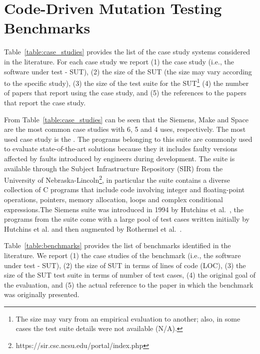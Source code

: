 

\section{Code-Driven Mutation Testing Benchmarks}
\label{section:industry:code}



Table~\ref{table:case_studies} provides the list of the case study systems considered in the literature. For each case study we report (1) the case study (i.e., the software under test - SUT), (2) the size of the SUT (the size may vary according to the specific study), (3) the size of the test suite for the SUT\footnote{The size may vary from an empirical evaluation to another; also, in some cases the test suite details were not available (N/A).} (4) the number of papers that report using the case study, and (5) the references to the papers that report the case study.


From Table~\ref{table:case_studies} can be seen that the Siemens, Make and Space are the most common case studies with 6, 5 and 4 uses, respectively. 
The most used case study is the . The programs belonging to this suite are commonly used to evaluate state-of-the-art solutions because they it includes faulty versions affected by faults introduced by engineers during development. The suite is available through the Subject Infrastructure Repository (SIR) from the University of Nebraska-Lincoln\footnote{https://sir.csc.ncsu.edu/portal/index.php}, in particular the suite contains a diverse collection of C programs that include code involving integer and floating-point operations, pointers, memory allocation, loops and complex conditional expressions.The Siemens suite was introduced in 1994 by Hutchins et al.~\cite{hutchins1994experiments}, the programs from the suite come with a large pool of test cases written initially by Hutchins et al. and then augmented by Rothermel et al.~\cite{rothermel1998empirical}.

Table~\ref{table:benchmarks} provides the list of benchmarks identified in the literature. We report (1) the case studies of the benchmark (i.e., the software under test - SUT), (2) the size of SUT in terms of lines of code (LOC), (3) the size of the SUT test suite in terms of number of test cases, (4) the original goal of the evaluation, and (5) the actual reference to the paper in which the benchmark was originally presented. 




